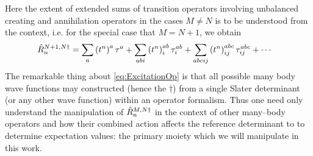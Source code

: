 Here the extent of extended sums of transition operators involving unbalanced creating and annihilation operators in the cases $M\neq N$ is to be understood from
the context, i.e. for the special case that $M= N+1$, we obtain
\begin{align}
&\hat{R}_n^{N+1,N\dagger} = \sum_a \left( t^n \right)^a \tau^a + \sum_{abi} \left( t^n \right)^{ab}_i \tau^{ab}_i + 
  \sum_{abcij} \left( t^n \right)^{abc}_{ij} \tau^{abc}_{ij} + \cdots
\end{align}
The remarkable thing about \cref{eq:ExcitationOp} is that all possible many body wave functions may constructed (hence the $\dagger$) from a single Slater determinant (or any other wave function)
within an operator formalism. Thus one need only understand the manipulation of $\hat{R}^{M,N\dagger}_n$ in the context of other many--body operators
and how their combined action affects the reference determinant to to determine expectation values: the primary moiety which we will 
manipulate in this work.

